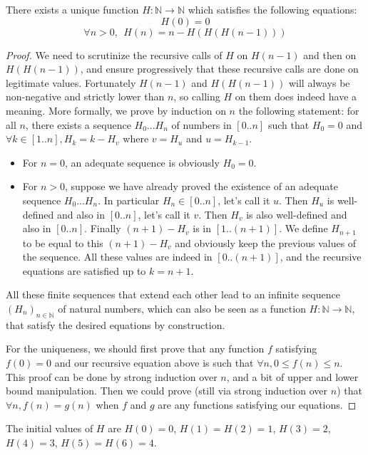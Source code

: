 \documentclass[a4paper,11pt]{article}
\begin{document}
\begin{theorem}\label{defG}There exists a unique function
  $H:\mathbb{N}\to\mathbb{N}$ which satisfies the following
  equations:
  $$H(0) = 0$$
  $$\forall n>0,~~ H(n) = n - H(H(H(n-1)))$$
\end{theorem}
\begin{proof}
We need to scrutinize the recursive calls of $H$ on $H(n-1)$ and then
on $H(H(n-1))$, and ensure progressively that these recursive calls
are done on legitimate values. Fortunately $H(n-1)$ and
$H(H(n-1))$ will always be non-negative and strictly lower than $n$, so
calling $H$ on them does indeed have a meaning.
More formally, we prove by induction on $n$ the following
statement: for all $n$, there exists a sequence $H_0...H_n$
of numbers in $[0..n]$ such that $H_0=0$ and
$\forall k\in[1..n], H_k = k - H_{v}$ where $v = H_u$ and $u = H_{k-1}$.
\begin{itemize}
\item For $n=0$, an adequate sequence is obviously $H_0 = 0$.
\item For $n>0$, suppose we have already proved the existence
  of an adequate sequence $H_0...H_n$.
  In particular $H_n \in [0..n]$, let's call it $u$.
  Then $H_u$ is well-defined and also in $[0..n]$, let's call it $v$.
  Then $H_v$ is also well-defined and also in $[0..n]$.
  Finally $(n+1)-H_v$ is in $[1..(n+1)]$. We define $H_{n+1}$ to be
  equal to this $(n+1)-H_v$ and obviously keep the previous values of the
  sequence. All these values are indeed in $[0..(n+1)]$, and the
  recursive equations are satisfied up to $k=n+1$.
\end{itemize}
All these finite sequences that extend each other
lead to an infinite sequence $(H_n)_{n\in\mathbb{N}}$ of natural
numbers, which can also be seen as a function
$H:\mathbb{N}\to\mathbb{N}$, that satisfy the desired equations
by construction.

For the uniqueness, we should first prove that any function $f$
satisfying $f(0)=0$ and our recursive equation above is such that
$\forall n, 0\le f(n)\le n$. This proof can be done by strong
induction over $n$, and a bit of upper and lower bound manipulation.
Then we could prove (still via strong induction
over $n$) that $\forall n, f(n)=g(n)$ when $f$ and $g$
are any functions satisfying our equations.
\end{proof}

The initial values of $H$ are
$H(0)=0$, $H(1)=H(2)=1$, $H(3)=2$, $H(4)=3$, $H(5)=H(6)=4$.
\end{document}
